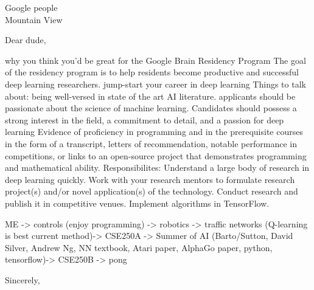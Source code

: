 \documentclass{letter}
\begin{document}
\begin{letter}{Google people \\ Mountain View}
\opening{Dear dude,}
why you think you'd be great for the Google Brain Residency Program
The goal of the residency program is to help residents become productive and successful deep learning researchers.
jump-start your career in deep learning
Things to talk about: being well-versed in state of the art AI literature.
 applicants should be passionate about the science of machine learning. 
Candidates should possess a strong interest in the field, a commitment to detail, and a passion for deep learning
Evidence of proficiency in programming and in the prerequisite courses in the form of a transcript, letters of recommendation, notable performance in competitions, or links to an open-source project that demonstrates programming and mathematical ability.
Responsibilites:
Understand a large body of research in deep learning quickly.
Work with your research mentors to formulate research project(s) and/or novel application(s) of the technology.
Conduct research and publish it in competitive venues.
Implement algorithms in TensorFlow.

ME -> controls (enjoy programming) -> robotics -> traffic networks (Q-learning is best current method)-> CSE250A -> Summer of AI (Barto/Sutton, David Silver, Andrew Ng, NN textbook, Atari paper, AlphaGo paper, python, tensorflow)-> CSE250B -> pong
\closing{Sincerely,}
\end{letter}
\end{document}
